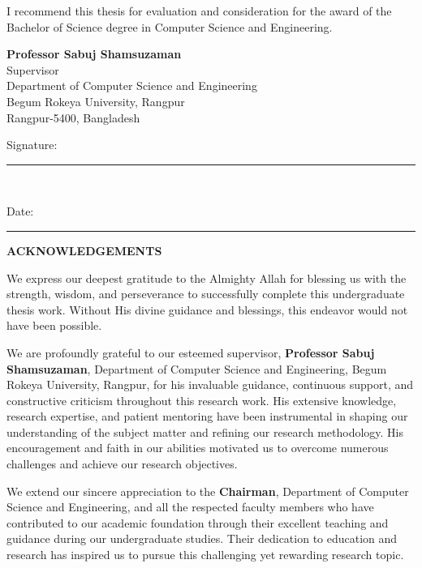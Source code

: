\documentclass[
  12pt,
  a4paper,
]{report}
\begin{document}
I recommend this thesis for evaluation and consideration for the award
of the Bachelor of Science degree in Computer Science and Engineering.

\vspace{3cm}

\begin{center}
\textbf{Professor Sabuj Shamsuzaman}\\
Supervisor\\
Department of Computer Science and Engineering\\
Begum Rokeya University, Rangpur\\
Rangpur-5400, Bangladesh\\

\vspace{1.5cm}

Signature: \rule{5cm}{0.5pt}\\

\vspace{0.5cm}

Date: \rule{3cm}{0.5pt}
\end{center}

\newpage

\newpage
\thispagestyle{plain}

\begin{center}
\vspace\*{2cm}
\textbf{\Large ACKNOWLEDGEMENTS}
\end{center}

\vspace{2cm}

We express our deepest gratitude to the Almighty Allah for blessing us
with the strength, wisdom, and perseverance to successfully complete
this undergraduate thesis work. Without His divine guidance and
blessings, this endeavor would not have been possible.

We are profoundly grateful to our esteemed supervisor,
\textbf{Professor Sabuj Shamsuzaman}, Department of Computer Science and
Engineering, Begum Rokeya University, Rangpur, for his invaluable
guidance, continuous support, and constructive criticism throughout this
research work. His extensive knowledge, research expertise, and patient
mentoring have been instrumental in shaping our understanding of the
subject matter and refining our research methodology. His encouragement
and faith in our abilities motivated us to overcome numerous challenges
and achieve our research objectives.

We extend our sincere appreciation to the \textbf{Chairman}, Department
of Computer Science and Engineering, and all the respected faculty
members who have contributed to our academic foundation through their
excellent teaching and guidance during our undergraduate studies. Their
dedication to education and research has inspired us to pursue this
challenging yet rewarding research topic.
\end{document}
